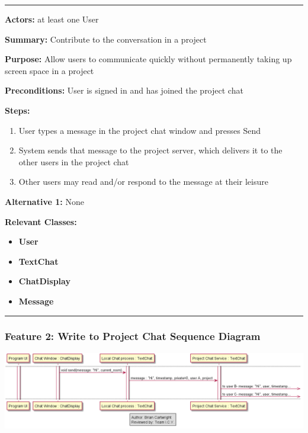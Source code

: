\documentclass[twoside,letterpaper]{article}
\begin{document}
\vspace{2pt}
\hrule
\vspace{8pt}
\textbf{Actors:} at least one User \newline

\noindent\textbf{Summary:} Contribute to the conversation in a project  \newline

\noindent\textbf{Purpose:} Allow users to communicate quickly without permanently taking up screen space in a project \newline

\noindent\textbf{Preconditions:} User is signed in and has joined the project chat \newline

\noindent\textbf{Steps:} \begin{enumerate}
	\item User types a message in the project chat window and presses Send
	\item System sends that message to the project server, which delivers it to the other users in the project chat
	\item Other users may read and/or respond to the message at their leisure
\end{enumerate}
\noindent\textbf{Alternative 1:} None \newline


\noindent\textbf{Relevant Classes:}
\begin{itemize}
	\item \textbf{User}
	\item \textbf{TextChat}
	\item \textbf{ChatDisplay}
	\item \textbf{Message}
\end{itemize}
\hrule
\newpage

\subsubsection[Communication Feature 2: Write to Project Chat Sequence Diagram]{\rmfamily\bfseries\color{black}
	Feature 2: Write to Project Chat Sequence Diagram}
\hypertarget{RefHeading22059017292}{}

\bigskip

\includegraphics[width=\textwidth]{images/SequenceDiagrams/Comms_WriteToProject}
\end{document}
